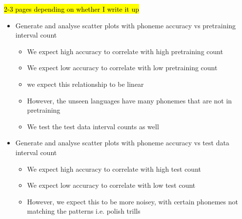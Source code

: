 \iffalse
\hl{2-3 pages depending on whether I write it up}
\begin{itemize}
    \iffalse
    \item Generate and analyse scatter plots with phoneme accuracy vs  pretraining interval count
    \begin{itemize}
        \item We expect high accuracy to correlate with high pretraining count
        \item We expect low accuracy to correlate with low pretraining count
        \item we expect this relationship to be linear
        \item However, the unseen languages have many phonemes that are not in pretraining
        \item We test the test data interval counts as well
    \end{itemize}
    \item Generate and analyse scatter plots with phoneme accuracy vs  test data interval count
    \begin{itemize}
        \item We expect high accuracy to correlate with high test count
        \item We expect low accuracy to correlate with low test count
        \item However, we expect this to be more noisey, with certain phonemes not matching the patterns i.e. polish trills
    \end{itemize}
    

\end{itemize}
